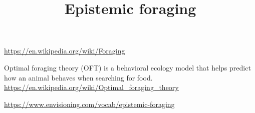 \documentclass[a4paper]{article}
\title{Epistemic foraging}
\date{}
\begin{document}
    \maketitle
    \url{https://en.wikipedia.org/wiki/Foraging}
    
    Optimal foraging theory (OFT) is a behavioral ecology model that helps predict how an animal behaves when searching for food.
    \url{https://en.wikipedia.org/wiki/Optimal_foraging_theory}
    
    \url{https://www.envisioning.com/vocab/epistemic-foraging}
\end{document}
